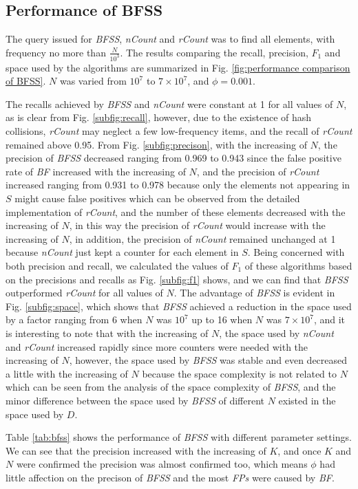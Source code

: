 \documentclass[conference]{IEEEtran}
\begin{document}
\subsection{Performance of BFSS}
The query issued for \emph{BFSS}, \emph{nCount} and \emph{rCount} was to find all elements, with frequency no more than $\frac{N}{10^3}$. The results comparing the recall, precision, $F_1$ and space used by the algorithms are summarized in Fig. \ref{fig:performance comparison of BFSS}. $N$ was varied from $10^7$ to $7\times 10^7$, and $\phi=0.001$.\par
The recalls achieved by \emph{BFSS} and \emph{nCount} were constant at 1 for all values of $N$, as is clear from Fig. \ref{subfig:recall}, however, due to the existence of hash collisions, \emph{rCount} may neglect a few low-frequency items, and the recall of \emph{rCount} remained above 0.95. From Fig. \ref{subfig:precison}, with the increasing of $N$, the precision of \emph{BFSS} decreased ranging from 0.969 to 0.943 since the false positive rate of \emph{BF} increased with the increasing of $N$, and the precision of \emph{rCount} increased ranging from 0.931 to 0.978 because only the elements not appearing in $S$ might cause false positives which can be observed from the detailed implementation of \emph{rCount}, and the number of these elements decreased with the increasing of $N$, in this way the precision of \emph{rCount} would increase with the increasing of $N$, in addition, the precision of \emph{nCount} remained unchanged at 1 because \emph{nCount} just kept a counter for each element in $S$. Being concerned with both precision and recall, we calculated the values of $F_1$ of these algorithms based on the precisions and recalls as Fig. \ref{subfig:f1} shows, and we can find that \emph{BFSS} outperformed \emph{rCount} for all values of $N$. The advantage of \emph{BFSS} is evident in Fig. \ref{subfig:space}, which shows that \emph{BFSS} achieved a reduction in the space used by a factor ranging from 6 when $N$ was $10^7$ up to 16 when $N$ was $7\times 10^7$, and it is interesting to note that with the increasing of $N$, the space used by \emph{nCount} and \emph{rCount} increased rapidly since more counters were needed with the increasing of $N$, however, the space used by \emph{BFSS} was stable and even decreased a little with the increasing of $N$ because the space complexity is not related to $N$ which can be seen from the analysis of the space complexity of \emph{BFSS}, and the minor difference between the space used by \emph{BFSS} of different $N$ existed in the space used by $D$.\par
Table \ref{tab:bfss} shows the performance of \emph{BFSS} with different parameter settings. We can see that the precision increased with the increasing of $K$, and once $K$ and $N$ were confirmed the precision was almost confirmed too, which means $\phi$ had little affection on the precison of \emph{BFSS} and the most \emph{FPs} were caused by \emph{BF}.
\end{document}

